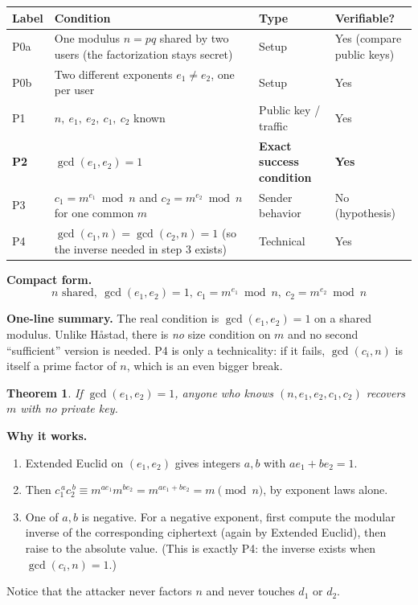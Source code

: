 \documentclass[11pt]{article}
\newtheorem{theorem}{Theorem}[section]
\theoremstyle{definition}
\theoremstyle{remark}
\newcommand{\minorhead}[1]{\par\medskip\noindent{\large\bfseries\itshape #1}\par\nopagebreak\smallskip}
\begin{document}
\minorhead{Setup}
\begin{center}
\begin{tabular}{@{}>{\raggedright\arraybackslash}p{1.1cm}>{\raggedright\arraybackslash}p{7.9cm}>{\raggedright\arraybackslash}p{3.4cm}>{\raggedright\arraybackslash}p{2.6cm}@{}}
\toprule
\textbf{Label} & \textbf{Condition} & \textbf{Type} & \textbf{Verifiable?} \\
\midrule
P0a & One modulus $n=pq$ shared by two users (the factorization stays secret) & Setup & Yes (compare public keys) \\
P0b & Two different exponents $e_1\ne e_2$, one per user & Setup & Yes \\
P1 & $n,\ e_1,\ e_2,\ c_1,\ c_2$ known & Public key / traffic & Yes \\
\textbf{P2} & \textbf{$\gcd(e_1,e_2)=1$} & \textbf{Exact success condition} & \textbf{Yes} \\
P3 & $c_1=m^{e_1}\bmod n$ and $c_2=m^{e_2}\bmod n$ for one common $m$ & Sender behavior & No (hypothesis) \\
P4 & $\gcd(c_1,n)=\gcd(c_2,n)=1$ (so the inverse needed in step 3 exists) & Technical & Yes \\
\bottomrule
\end{tabular}
\end{center}

\textbf{Compact form.}
\[
\boxed{\;n\text{ shared},\ \gcd(e_1,e_2)=1,\ c_1=m^{e_1}\bmod n,\ c_2=m^{e_2}\bmod n\;}
\]

\textbf{One-line summary.} The real condition is $\gcd(e_1,e_2)=1$ on a shared modulus. Unlike Håstad, there is \emph{no} size condition on $m$ and no second ``sufficient'' version is needed. P4 is only a technicality: if it fails, $\gcd(c_i,n)$ is itself a prime factor of $n$, which is an even bigger break.

\begin{theorem}\label{thm:commonmod}
If $\gcd(e_1,e_2)=1$, anyone who knows $(n,e_1,e_2,c_1,c_2)$ recovers $m$ with no private key.
\end{theorem}

\textbf{Why it works.}
\begin{enumerate}[nosep]
\item Extended Euclid on $(e_1,e_2)$ gives integers $a,b$ with $ae_1+be_2=1$.
\item Then $c_1^{\,a}c_2^{\,b}\equiv m^{ae_1}m^{be_2}=m^{ae_1+be_2}=m \pmod n$, by exponent laws alone.
\item One of $a,b$ is negative. For a negative exponent, first compute the modular inverse of the corresponding ciphertext (again by Extended Euclid), then raise to the absolute value. (This is exactly P4: the inverse exists when $\gcd(c_i,n)=1$.)
\end{enumerate}
Notice that the attacker never factors $n$ and never touches $d_1$ or $d_2$.
\end{document}
